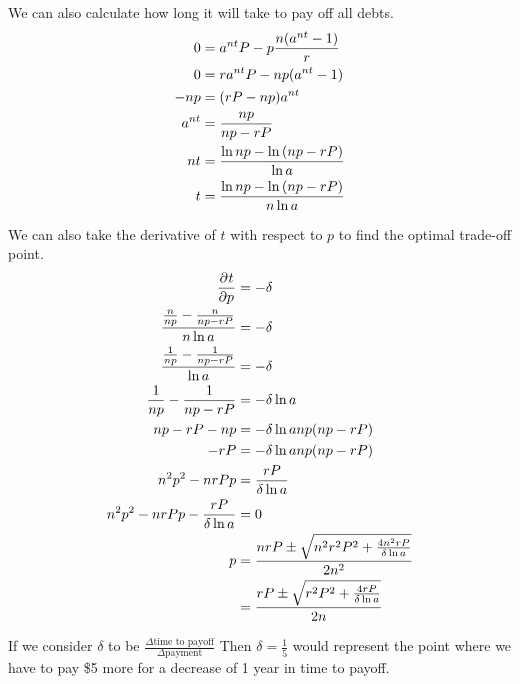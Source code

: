 \documentclass[12pt]{article}
\begin{document}
We can also calculate how long it will take to pay off all debts.
\begin{align*}
    0 &= a^{nt} P - p \frac{n (a^{nt} - 1)}{r}\\
    0 &= ra^{nt} P - np (a^{nt} - 1)\\
    -np &= (rP - np) a^{nt}\\
    a^{nt} &= \frac{np}{np - rP}\\
    nt &= \frac{\ln{np} - \ln\del{np - rP}}{\ln{a}}\\
    t &= \frac{\ln{np} - \ln\del{np - rP}}{n\ln{a}}
\end{align*}

We can also take the derivative of $t$ with respect to $p$ to find the optimal
trade-off point.
\begin{align*}
    \dpd{t}{p} &= -\delta\\
    \frac{\frac{n}{np} - \frac{n}{np - rP}}{n \ln{a}} &= -\delta\\
    \frac{\frac{1}{np} - \frac{1}{np - rP}}{\ln{a}} &= -\delta\\
    \frac{1}{np} - \frac{1}{np - rP} &= -\delta \ln{a}\\
    np - rP - np &= -\delta \ln{a} np (np - rP)\\
    -rP &= -\delta \ln{a} np (np - rP)\\
    n^2 p^2 - nrP p &= \frac{rP}{\delta \ln{a}}\\
    n^2 p^2 - nrP p - \frac{rP}{\delta \ln{a}} &= 0\\
    p &= \frac{nrP \pm \sqrt{n^2r^2P^2 + \frac{4n^2 rP}{\delta \ln{a}}}}{2n^2}\\
      &= \frac{rP \pm \sqrt{r^2P^2 + \frac{4rP}{\delta \ln{a}}}}{2n}
\end{align*}

If we consider $\delta$ to be
$\frac{\Delta\text{time to payoff}}{\Delta\text{payment}}$
Then $\delta = \frac{1}{5}$ would represent the point where we have to pay \$5
more for a decrease of 1 year in time to payoff.
\end{document}
